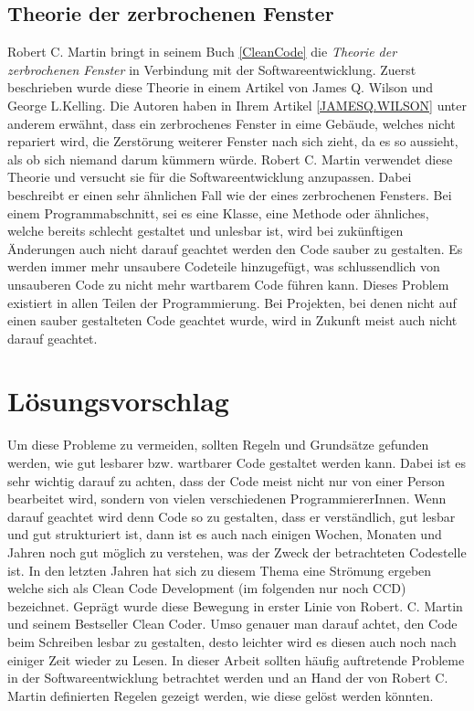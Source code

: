 \subsection{Theorie der zerbrochenen Fenster}
\SuperPar Robert C. Martin bringt in seinem Buch \ref{CleanCode} die \textit{Theorie der zerbrochenen Fenster} in Verbindung mit der Softwareentwicklung. Zuerst beschrieben wurde diese Theorie in einem Artikel von James Q. Wilson und George L.Kelling. Die Autoren haben in Ihrem Artikel \ref{JAMESQ.WILSON} unter anderem erwähnt, dass ein zerbrochenes Fenster in eime Gebäude, welches nicht repariert wird, die Zerstörung weiterer Fenster nach sich zieht, da es so aussieht, als ob sich niemand darum kümmern würde. Robert C. Martin verwendet diese Theorie und versucht sie für die Softwareentwicklung anzupassen. Dabei beschreibt er einen sehr ähnlichen Fall wie der eines zerbrochenen Fensters. Bei einem Programmabschnitt, sei es eine Klasse, eine Methode oder ähnliches, welche bereits schlecht gestaltet und unlesbar ist, wird bei zukünftigen Änderungen auch nicht darauf geachtet werden den Code sauber zu gestalten. Es werden immer mehr unsaubere Codeteile hinzugefügt, was schlussendlich von unsauberen Code zu nicht mehr wartbarem Code führen kann. Dieses Problem existiert in allen Teilen der Programmierung. Bei Projekten, bei denen nicht auf einen sauber gestalteten Code geachtet wurde, wird in Zukunft meist auch nicht darauf geachtet.

\section{Lösungsvorschlag}
\SuperPar Um diese Probleme zu vermeiden, sollten Regeln und Grundsätze gefunden werden, wie gut lesbarer bzw. wartbarer Code gestaltet werden kann. Dabei ist es sehr wichtig darauf zu achten, dass der Code meist nicht nur von einer Person bearbeitet wird, sondern von vielen verschiedenen ProgrammiererInnen. Wenn darauf geachtet wird denn Code so zu gestalten, dass er verständlich, gut lesbar und gut strukturiert ist, dann ist es auch nach einigen Wochen, Monaten und Jahren noch gut möglich zu verstehen, was der Zweck der betrachteten Codestelle ist. In den letzten Jahren hat sich zu diesem Thema eine Strömung ergeben welche sich als Clean Code Development (im folgenden nur noch CCD) bezeichnet. Geprägt wurde diese Bewegung in erster Linie von Robert. C. Martin und seinem Bestseller Clean Coder. Umso genauer man darauf achtet, den Code beim Schreiben lesbar zu gestalten, desto leichter wird es diesen auch noch nach einiger Zeit wieder zu Lesen. In dieser Arbeit sollten häufig auftretende Probleme in der Softwareentwicklung betrachtet werden und an Hand der von Robert C. Martin definierten Regelen gezeigt werden, wie diese gelöst werden könnten.

